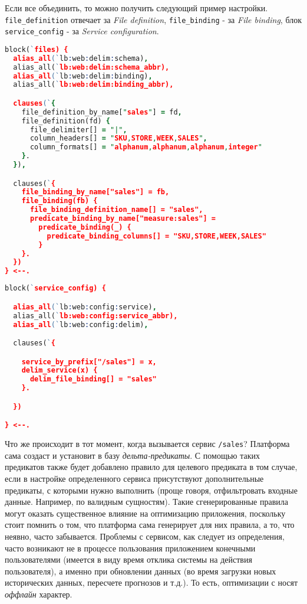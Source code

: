 Если все объединить, то можно получить следующий пример настройки. \lstinline{file_definition} отвечает за \emph{File definition}, \lstinline{file_binding} - за \emph{File binding}, блок \lstinline{service_config} - за \emph{Service configuration}.

\begin{lstlisting}[language=Prolog]
block(`files) {
  alias_all(`lb:web:delim:schema),
  alias_all(`lb:web:delim:schema_abbr),
  alias_all(`lb:web:delim:binding),
  alias_all(`lb:web:delim:binding_abbr),

  clauses(`{
    file_definition_by_name["sales"] = fd,
    file_definition(fd) {
      file_delimiter[] = "|",
      column_headers[] = "SKU,STORE,WEEK,SALES",
      column_formats[] = "alphanum,alphanum,alphanum,integer"
    }.
  }),

  clauses(`{
    file_binding_by_name["sales"] = fb,
    file_binding(fb) {
      file_binding_definition_name[] = "sales",
      predicate_binding_by_name["measure:sales"] =
        predicate_binding(_) {
          predicate_binding_columns[] = "SKU,STORE,WEEK,SALES"
        }
    }.
  })
} <--.
\end{lstlisting}

\begin{lstlisting}[language=Prolog]
block(`service_config) {

  alias_all(`lb:web:config:service),
  alias_all(`lb:web:config:service_abbr),
  alias_all(`lb:web:config:delim),

  clauses(`{

    service_by_prefix["/sales"] = x,
    delim_service(x) {
      delim_file_binding[] = "sales"
    }.

  })

} <--.
\end{lstlisting}

Что же происходит в тот момент, когда вызывается сервис \lstinline{/sales}? Платформа сама создаст и установит в базу  \emph{дельта-предикаты}. С помощью таких предикатов также будет добавлено \logiql правило для целевого предиката в том случае, если в настройке определенного \tdx сервиса присутствуют дополнительные предикаты, с которыми нужно выполнить \join (проще говоря, отфильтровать входные данные. Например, по валидным сущностям). Такие сгенерированные правила могут оказать существенное влияние на оптимизацию приложения, поскольку стоит помнить о том, что платформа сама генерирует для них правила, а то, что неявно, часто забывается. Проблемы с \tdx сервисом, как следует из определения, часто возникают не в процессе пользования приложением конечными пользователями (имеется в виду время отклика системы на действия пользователя), а именно при обновлении данных (во время загрузки новых исторических данных, пересчете прогнозов и т.д.). То есть, оптимизации с \tdx носят \emph{оффлайн} характер.
